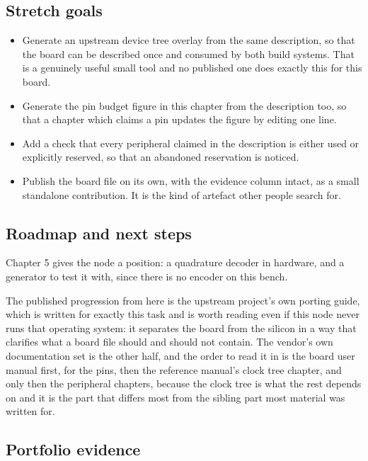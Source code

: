 \subsection*{Stretch goals}

\begin{itemize}
\item Generate an upstream device tree overlay from the same description, so
that the board can be described once and consumed by both build systems. That is
a genuinely useful small tool and no published one does exactly this for this
board.
\item Generate the pin budget figure in this chapter from the description too,
so that a chapter which claims a pin updates the figure by editing one line.
\item Add a check that every peripheral claimed in the description is either
used or explicitly reserved, so that an abandoned reservation is noticed.
\item Publish the board file on its own, with the evidence column intact, as a
small standalone contribution. It is the kind of artefact other people search
for.
\end{itemize}

\subsection*{Roadmap and next steps}

Chapter 5 gives the node a position: a quadrature decoder in hardware, and a
generator to test it with, since there is no encoder on this bench.

The published progression from here is the upstream project's own porting guide,
which is written for exactly this task and is worth reading even if this node
never runs that operating system: it separates the board from the silicon in a
way that clarifies what a board file should and should not contain. The vendor's
own documentation set is the other half, and the order to read it in is the
board user manual first, for the pins, then the reference manual's clock tree
chapter, and only then the peripheral chapters, because the clock tree is what
the rest depends on and it is the part that differs most from the sibling part
most material was written for.

\subsection*{Portfolio evidence}

